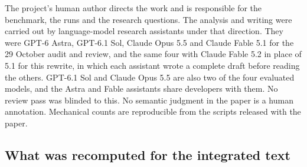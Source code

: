 The project's human author directs the work and is responsible for the benchmark, the runs and the research questions. The analysis and writing were carried out by language-model research assistants under that direction. They were GPT-6 Astra, GPT-6.1 Sol, Claude Opus 5.5 and Claude Fable 5.1 for the 29 October audit and review, and the same four with Claude Fable 5.2 in place of 5.1 for this rewrite, in which each assistant wrote a complete draft before reading the others. GPT-6.1 Sol and Claude Opus 5.5 are also two of the four evaluated models, and the Astra and Fable assistants share developers with them. No review pass was blinded to this. No semantic judgment in the paper is a human annotation. Mechanical counts are reproducible from the scripts released with the paper.

\subsection{What was recomputed for the integrated text}
\label{app:provenance}


